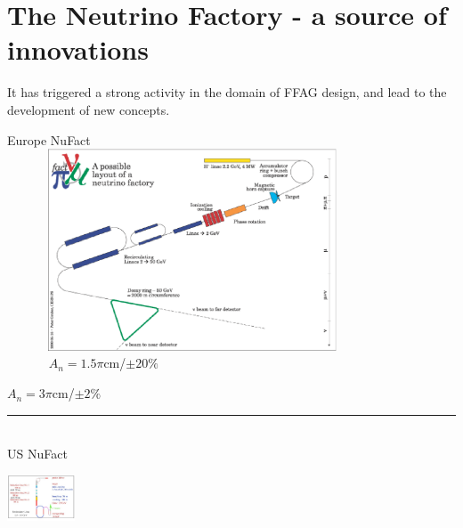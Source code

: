 \documentclass[12pt]{article}
\begin{document}
\clearpage 

\section{\LARGE     The Neutrino Factory - a source of innovations}

\large  
It has triggered a strong activity  in the domain of FFAG design, and lead to the development of new concepts. 

\medskip

\begin{minipage}[b]{.43\linewidth}
\LARGE Europe NuFact\\
\includegraphics[bbllx=14,bblly=14,bburx=515,bbury=365,width=11cm,height=6cm]{./figs_FFAG_introSlides/CERN_nf_triangle.eps} \\

\vspace{-55mm}
{\footnotesize \hspace{0cm}  ~ ~ ~ ~ $A_n=1.5\pi$cm/$\pm20\%$}

\vspace{25mm}

{\footnotesize \hspace{0cm} $A_n=3\pi$cm/$\pm2\%$}
\vspace{10mm}

\rule{20mm}{.4mm}\\
\LARGE US NuFact 
\vspace{-25mm} 

\hspace{35mm}\includegraphics*[bbllx=160,bblly=30,bburx=235,bbury=280,width=2cm,angle=-90]{./figs_FFAG_introSlides/study-2.eps}   \\


\end{minipage}
\end{document}
